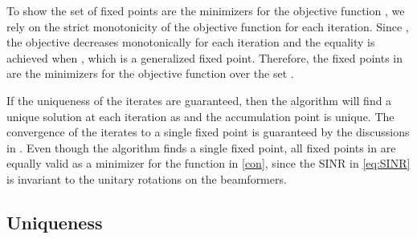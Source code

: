 To show the set of fixed points  are the minimizers for the objective function , we rely on the strict monotonicity of the objective function for each iteration. Since , the objective decreases monotonically for each iteration and the equality is achieved when , which is a generalized fixed point. Therefore, the fixed points in  are the minimizers for the objective function  over the set .

If the uniqueness of the iterates are guaranteed, then the algorithm will find a unique solution at each iteration as  and the accumulation point is unique. The convergence of the iterates to a single fixed point is guaranteed by the discussions in \cite{meyer1976sufficient,zangwill1969nonlinear}. Even though the algorithm finds a single fixed point, all fixed points in  are equally valid as a minimizer for the function  in \eqref{con}, since the \ac{SINR} in \eqref{eq:SINR} is invariant to the unitary rotations on the beamformers.

\subsection{Uniqueness}






